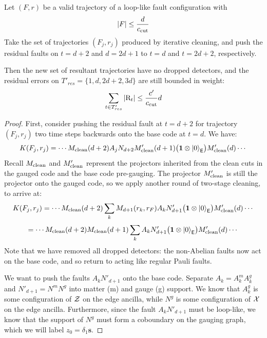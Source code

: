\documentclass[11pt]{article}
\begin{document}
\begin{lemma}
\label{lem:ungauging-cleaning}
    Let $(F, r)$ be a valid trajectory of a loop-like fault configuration with 
    \[
    |F| \leq \frac{d}{c_{\rm cut}}
    \]
    Take the set of trajectories $(F_j, r_j)$ produced by iterative cleaning, and push the residual faults on $t = d+2$ and $d = 2d+1$ to $t=d$ and $t=2d+2$, respectively. 

    Then the new set of resultant trajectories have no dropped detectors, and the residual errors on $T'_{res} = \{1, d, 2d+2, 3d\}$ are still bounded in weight:
    \[
    \sum_{t \in T'_{res}} |\mathrm{R}_t| \leq \frac{c'}{c_{\rm cut}} d
    \]
\end{lemma}
\begin{proof}
    
    First, consider pushing the residual fault at $t= d+2$ for trajectory $(F_j, r_j)$ two time steps backwards onto the base code at $t = d$. We have:
    \[
    K(F_j, r_j) =\cdots  M_{\rm clean}(d+2) A_j N_{d+2} M'_{\rm clean}(d+1) \bigl ( \mathbf{1} \otimes \ket{0}_{\mathsf{E}}  \bigr ) M'_{\rm clean}(d) \cdots 
    \]
    Recall $M_{\rm clean}$ and $M'_{\rm clean}$ represent the projectors inherited from the clean cuts in the gauged code and the base code pre-gauging. The projector $M'_{\rm clean}$ is still the projector onto the gauged code, so we apply another round of two-stage cleaning, to arrive at:
    \[
    K(F_j, r_j) = \cdots  M_{\rm clean}(d+2) \sum_{k} M_{d+1}(r_k, r_{F}) A_k N'_{d+1} \bigl ( \mathbf{1} \otimes \ket{0}_{\mathsf{E}}  \bigr ) M'_{\rm clean}(d) \cdots 
    \]
    \[
    = \cdots  M_{\rm clean}(d+2) M_{\rm clean}(d+1) \sum_{k} A_k N'_{d+1} \bigl ( \mathbf{1} \otimes \ket{0}_{\mathsf{E}}  \bigr ) M'_{\rm clean}(d) \cdots 
    \]
    Note that we have removed all dropped detectors: the non-Abelian faults now act on the base code, and so return to acting like regular Pauli faults.
    
    We want to push the faults $A_k N'_{d+1}$ onto the base code. Separate $A_k = A^m_k A^g_k$ and $N'_{d+1} = N^m N^g$ into matter (m) and gauge (g) support. We know that $A^g_k$ is some configuration of $\mathcal{Z}$ on the edge ancilla, while $N^g$ is some configuration of $\mathcal{X}$ on the edge ancilla. Furthermore, since the fault $A_k N'_{d+1}$ must be loop-like, we know that the support of $N^g$ must form a coboundary on the gauging graph, which we will label $z_0 = \delta_1 \bm{s}$. 


\end{proof}
\end{document}
